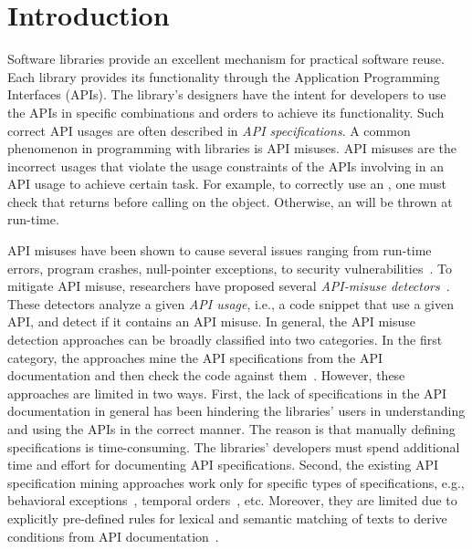 \section{Introduction}
\label{sec:intro}

Software libraries provide an excellent mechanism for practical
software reuse. Each library provides its functionality through the
Application Programming Interfaces (APIs). The library's designers
have the intent for developers to use the APIs in specific
combinations and orders to achieve its functionality. Such correct API
usages are often described in {\em API specifications}. A common
phenomenon in programming with libraries is API misuses. API misuses
are the incorrect usages that violate the usage constraints of the
APIs involving in an API usage to achieve certain task.  For example,
to correctly use an , one must check that
 returns  before calling
 on the  object. Otherwise,
an  will be thrown at run-time.

API misuses have been shown to cause several issues ranging from
run-time errors, program crashes, null-pointer exceptions, to security
vulnerabilities~\cite{mudetect-msr19,MM13,SHA15,FHMB+12,EBFK13,NKMB16,GIJA+12,ANNN+16}. To
mitigate API misuse, researchers have proposed several
\emph{API-misuse
detectors}~\cite{LZ05,L07,WZL07,RGJ07,NNP+09,AX09,TX09,TX09b,WZ11,MM13,NPVN16}.
These detectors analyze a given \emph{API usage}, i.e., a code snippet
that use a given API, and detect if it contains an API misuse.  In
general, the API misuse detection approaches can be broadly classified
into two categories. In the first category, the approaches mine the
API specifications from the API documentation and then check the code
against
them~\cite{ase22,jdoctor-issta18,zhou-icse17,c2s-fse20}. However,
these approaches are limited in two ways. First, the lack of
specifications in the API documentation in general has been hindering
the libraries' users in understanding and using the APIs in the
correct manner. The reason is that manually defining specifications is
time-consuming. The libraries' developers must spend additional time
and effort for documenting API specifications. Second, the existing
API specification mining approaches work only for specific types of
specifications, e.g., behavioral exceptions~\cite{ase22}, temporal
orders~\cite{icse17-nier}, etc. Moreover, they are limited due to
explicitly pre-defined rules for lexical and semantic matching of
texts to derive conditions from API
documentation~\cite{zhou-icse17,jdoctor-issta18}.

